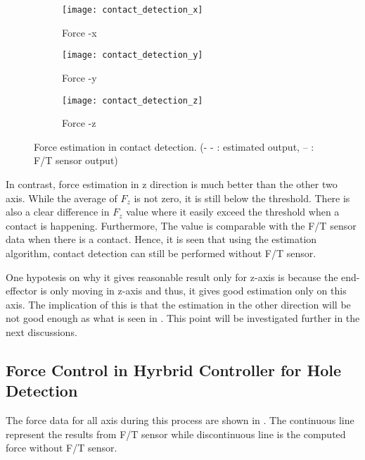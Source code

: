 \begin{figure}[h]
  \begin{subfigure}[t]{0.5\textwidth}
    \centering
    \texttt{[image: contact\_detection\_x]} 
    \caption{Force -x}
  \end{subfigure}
  \begin{subfigure}[t]{0.5\textwidth}
    \centering
    \texttt{[image: contact\_detection\_y]}
    \caption{Force -y}
  \end{subfigure}
  \begin{subfigure}[t]{0.5\textwidth}
    \centering
    \texttt{[image: contact\_detection\_z]}
    \caption{Force -z}
  \end{subfigure}  
  \caption{Force estimation in contact detection. (- - : estimated output, -- : F/T sensor output)}
  \label{fig:contact detection}
\end{figure}

In contrast, force estimation in z direction is much better than the other two axis. While the average of $F_{z}$ is not zero, it is still below the threshold. There is also a clear difference in $F_{z}$ value where it easily exceed the threshold when a contact is happening. Furthermore, The value is comparable with the F/T sensor data when there is a contact. Hence, it is seen that using the estimation algorithm, contact detection can still be performed without F/T sensor.

One hypotesis on why it gives reasonable result only for z-axis is because the end-effector is only moving in z-axis and thus, it gives good estimation only on this axis. The implication of this is that the estimation in the other direction will be not good enough as what is seen in . This point will be investigated further in the next discussions. 

\subsection{Force Control in Hyrbrid Controller for Hole Detection}

The force data for all axis during this process are shown in . The continuous line represent the results from F/T sensor while discontinuous line is the computed force without F/T sensor.

